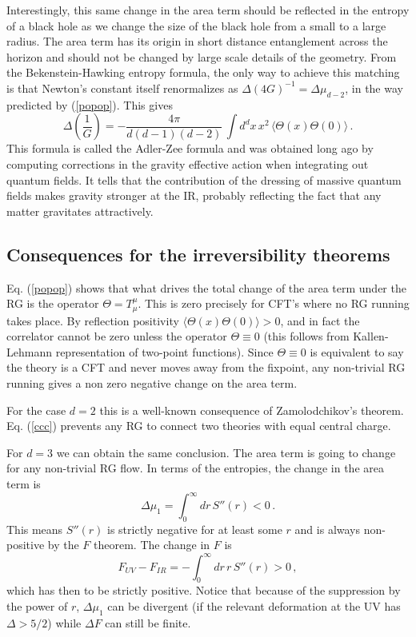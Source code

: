 \documentclass[12pt]{article}
\numberwithin{equation}{section}
\newcommand{\be}{\begin{equation}}
\newcommand{\ee}{\end{equation}}
\begin{document}
\bigskip

Interestingly, this same change in the area term should be reflected in the entropy of a black hole as we change the size of the black hole from a small to a large radius. The area term has its origin in short distance entanglement across the horizon and should not be changed by large scale details of the geometry. From the Bekenstein-Hawking entropy formula, the only way to achieve this matching is that Newton's constant itself renormalizes as $\Delta (4G)^{-1}=\Delta \mu_{d-2}$, in the way predicted by (\ref{popop}). This gives
\be
\Delta \left(\frac{1}{G}\right)= -\frac{4\pi}{d (d-1)(d-2)}\,\int d^{d}x\,x^2\,\langle \Theta(x) \Theta(0)\rangle\,.
\ee
This formula is called the Adler-Zee formula and was obtained long ago by computing corrections in the gravity effective action when integrating out quantum fields. It tells that the contribution of the dressing of massive quantum fields makes gravity stronger at the IR, probably reflecting the fact that any matter gravitates attractively.     

\subsection{Consequences for the irreversibility theorems}
Eq. (\ref{popop}) shows that what drives the total change of the area term under the RG is the operator $\Theta=T_\mu^\mu$. This is zero precisely for CFT's where no RG running takes place. By reflection positivity $\langle \Theta(x) \Theta(0)\rangle>0$, and in fact the correlator cannot be zero unless the operator $\Theta\equiv 0$ (this follows from Kallen-Lehmann representation of two-point functions). Since $\Theta\equiv 0$ is equivalent to say the theory is a CFT and never moves away from the fixpoint, any non-trivial RG running gives a non zero negative change on the area term. 

For the case $d=2$ this is a well-known consequence of Zamolodchikov's theorem. Eq. (\ref{ccc}) prevents any RG to connect two theories with equal central charge.     

For $d=3$ we can obtain the same conclusion. The area term is going to change for any non-trivial RG flow. In terms of the entropies, the change in the area term is
\be
\Delta \mu_{1}= \int_0^\infty dr\, S''(r)<0\,.
\ee
This means $S''(r)$ is strictly negative for at least some $r$ and is always non-positive by the $F$ theorem. The change in $F$ is
\be
 F_{UV}-F_{IR}= -\int_0^\infty dr\, r\, S''(r)>0\,,
\ee
which has then to be strictly positive. Notice that because of the suppression by the power of $r$, $\Delta \mu_1$ can be divergent (if the relevant deformation at the UV has $\Delta> 5/2$) while $\Delta F$ can still be finite. 
\end{document}
